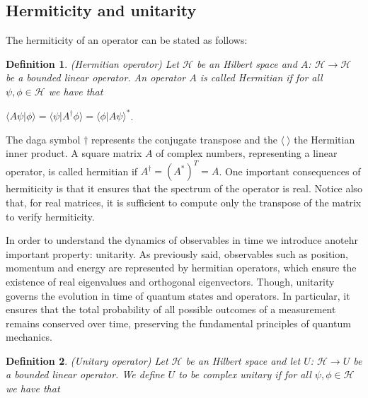 \documentclass{Configuration_Files/PoliMi3i_thesis}
\newtheorem{definition}{Definition}[chapter]
\begin{document}
\subsection{Hermiticity and unitarity}

The hermiticity of an operator can be stated as follows:

\begin{definition} (Hermitian operator) Let $\mathscr{H}$ be an Hilbert space and  $A$: $\mathscr{H} \rightarrow \mathscr{H}$ be a bounded linear operator. An operator $A$ is called Hermitian if for all $\psi,\phi \in \mathscr{H}$ we have that
\end{definition}

\begin{center}
	$\langle A\psi|\phi \rangle = \langle \psi|A^{\dagger}\phi \rangle = \langle \phi|A\psi \rangle^{*}$.
\end{center}

The daga symbol $\dagger$ represents the conjugate transpose and the $\langle \ \rangle$ the Hermitian inner product. A square matrix $A$ of complex numbers, representing a linear operator, is called hermitian if $A^{\dagger} = (A^*)^T = A$. One important consequences of hermiticity is that it ensures that the spectrum of the operator is real. Notice also that, for real matrices, it is sufficient to compute only the transpose of the matrix to verify hermiticity. \newline

In order to understand the dynamics of observables in time we introduce anotehr important property: unitarity. 
As previously said, observables such as position, momentum and energy are represented by hermitian operators, which ensure the existence of real eigenvalues and orthogonal eigenvectors. Though, unitarity governs the evolution in time of quantum states and operators. In particular, it ensures that the total probability of all possible outcomes of a measurement remains conserved over time, preserving the fundamental principles of quantum mechanics. 

\begin{definition} (Unitary operator) Let $\mathscr{H}$ be an Hilbert space and let $U$: $\mathscr{H} \rightarrow U$ be a bounded linear operator. We define $U$ to be complex unitary if for all $\psi,\phi \in \mathscr{H}$ we have that
\end{definition}
\end{document}
